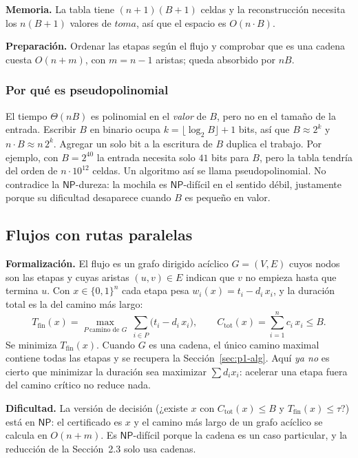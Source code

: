 \documentclass[11pt,a4paper]{article}
\theoremstyle{definition}
\newcommand{\Tfin}{T_{\mathrm{fin}}}
\newcommand{\Ctot}{C_{\mathrm{tot}}}
\newcommand{\NP}{\mathsf{NP}}
\begin{document}
\textbf{Memoria.} La tabla tiene $(n+1)(B+1)$ celdas y la reconstrucción necesita los $n(B+1)$ valores de $toma$, así que el espacio es $O(n\cdot B)$.

\textbf{Preparación.} Ordenar las etapas según el flujo y comprobar que es una cadena cuesta $O(n+m)$, con $m=n-1$ aristas; queda absorbido por $nB$.

\subsubsection*{Por qué es pseudopolinomial}

El tiempo $\Theta(nB)$ es polinomial en el \emph{valor} de $B$, pero no en el tamaño de la entrada. Escribir $B$ en binario ocupa $k=\lfloor\log_2 B\rfloor+1$ bits, así que $B\approx 2^{k}$ y $n\cdot B\approx n\,2^{k}$. Agregar un solo bit a la escritura de $B$ duplica el trabajo. Por ejemplo, con $B=2^{40}$ la entrada necesita solo $41$ bits para $B$, pero la tabla tendría del orden de $n\cdot 10^{12}$ celdas. Un algoritmo así se llama pseudopolinomial. No contradice la $\NP$-dureza: la mochila es $\NP$-difícil en el sentido débil, justamente porque su dificultad desaparece cuando $B$ es pequeño en valor.

\subsection{Flujos con rutas paralelas}\label{sec:p1-general}

\textbf{Formalización.} El flujo es un grafo dirigido acíclico $G=(V,E)$ cuyos nodos son las etapas y cuyas aristas $(u,v)\in E$ indican que $v$ no empieza hasta que termina $u$. Con $x\in\{0,1\}^n$ cada etapa pesa $w_i(x)=t_i-d_i\,x_i$, y la duración total es la del camino más largo:
\[
\Tfin(x)=\max_{P\ \text{camino de }G}\ \sum_{i\in P}\bigl(t_i-d_i\,x_i\bigr),
\qquad
\Ctot(x)=\sum_{i=1}^{n}c_i\,x_i\le B .
\]
Se minimiza $\Tfin(x)$. Cuando $G$ es una cadena, el único camino maximal contiene todas las etapas y se recupera la Sección~\ref{sec:p1-alg}. Aquí \emph{ya no} es cierto que minimizar la duración sea maximizar $\sum d_ix_i$: acelerar una etapa fuera del camino crítico no reduce nada.

\textbf{Dificultad.} La versión de decisión (¿existe $x$ con $\Ctot(x)\le B$ y $\Tfin(x)\le\tau$?) está en $\NP$: el certificado es $x$ y el camino más largo de un grafo acíclico se calcula en $O(n+m)$. Es $\NP$-difícil porque la cadena es un caso particular, y la reducción de la Sección~2.3 solo usa cadenas.
\end{document}
